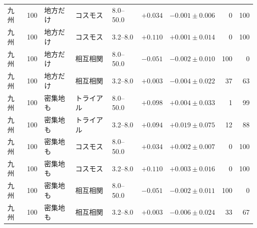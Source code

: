 \begin{tabular}{lllllrrrr}
九州 & 100 & 地方だけ & コスモス & 8.0--50.0 & $+0.034$ & $-0.001 \pm 0.006$ & 0 & 100 \\
九州 & 100 & 地方だけ & コスモス & 3.2--8.0 & $+0.110$ & $+0.001 \pm 0.014$ & 0 & 100 \\
九州 & 100 & 地方だけ & 相互相関 & 8.0--50.0 & $-0.051$ & $-0.002 \pm 0.010$ & 100 & 0 \\
九州 & 100 & 地方だけ & 相互相関 & 3.2--8.0 & $+0.003$ & $-0.004 \pm 0.022$ & 37 & 63 \\
九州 & 100 & 密集地も & トライアル & 8.0--50.0 & $+0.098$ & $+0.004 \pm 0.033$ & 1 & 99 \\
九州 & 100 & 密集地も & トライアル & 3.2--8.0 & $+0.094$ & $+0.019 \pm 0.075$ & 12 & 88 \\
九州 & 100 & 密集地も & コスモス & 8.0--50.0 & $+0.034$ & $+0.002 \pm 0.007$ & 0 & 100 \\
九州 & 100 & 密集地も & コスモス & 3.2--8.0 & $+0.110$ & $+0.003 \pm 0.016$ & 0 & 100 \\
九州 & 100 & 密集地も & 相互相関 & 8.0--50.0 & $-0.051$ & $-0.002 \pm 0.011$ & 100 & 0 \\
九州 & 100 & 密集地も & 相互相関 & 3.2--8.0 & $+0.003$ & $-0.006 \pm 0.024$ & 33 & 67 \\
\bottomrule
\end{tabular}
